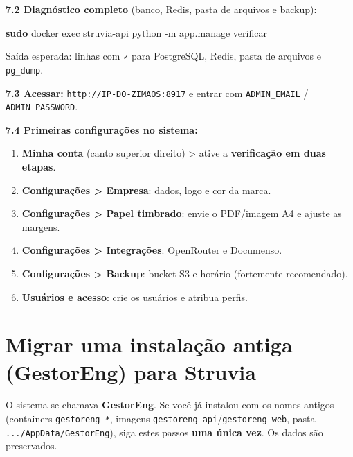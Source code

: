 \documentclass[
  10pt,
]{article}
\newenvironment{Shaded}{\begin{snugshade}}{\end{snugshade}}
\newcommand{\AttributeTok}[1]{\textcolor[rgb]{0.13,0.29,0.53}{#1}}
\newcommand{\FunctionTok}[1]{\textcolor[rgb]{0.13,0.29,0.53}{\textbf{#1}}}
\newcommand{\NormalTok}[1]{#1}
\providecommand{\tightlist}{%
  \setlength{\itemsep}{0pt}\setlength{\parskip}{0pt}}
\begin{document}
\textbf{7.2 Diagnóstico completo} (banco, Redis, pasta de arquivos e
backup):

\begin{Shaded}
\begin{Highlighting}[]
\FunctionTok{sudo}\NormalTok{ docker exec struvia{-}api python }\AttributeTok{{-}m}\NormalTok{ app.manage verificar}
\end{Highlighting}
\end{Shaded}

Saída esperada: linhas com \texttt{✓} para PostgreSQL, Redis, pasta de
arquivos e \texttt{pg\_dump}.

\textbf{7.3 Acessar:} \texttt{http://IP-DO-ZIMAOS:8917} e entrar com
\texttt{ADMIN\_EMAIL} / \texttt{ADMIN\_PASSWORD}.

\textbf{7.4 Primeiras configurações no sistema:}

\begin{enumerate}
\def\labelenumi{\arabic{enumi}.}
\tightlist
\item
  \textbf{Minha conta} (canto superior direito) \textgreater{} ative a
  \textbf{verificação em duas etapas}.
\item
  \textbf{Configurações \textgreater{} Empresa}: dados, logo e cor da
  marca.
\item
  \textbf{Configurações \textgreater{} Papel timbrado}: envie o
  PDF/imagem A4 e ajuste as margens.
\item
  \textbf{Configurações \textgreater{} Integrações}: OpenRouter e
  Documenso.
\item
  \textbf{Configurações \textgreater{} Backup}: bucket S3 e horário
  (fortemente recomendado).
\item
  \textbf{Usuários e acesso}: crie os usuários e atribua perfis.
\end{enumerate}

\hypertarget{migrar-uma-instalauxe7uxe3o-antiga-gestoreng-para-struvia}{%
\section{Migrar uma instalação antiga (GestorEng) para
Struvia}\label{migrar-uma-instalauxe7uxe3o-antiga-gestoreng-para-struvia}}

O sistema se chamava \textbf{GestorEng}. Se você já instalou com os
nomes antigos (containers \texttt{gestoreng-*}, imagens
\texttt{gestoreng-api}/\texttt{gestoreng-web}, pasta
\texttt{.../AppData/GestorEng}), siga estes passos \textbf{uma única
vez}. Os dados são preservados.
\end{document}
